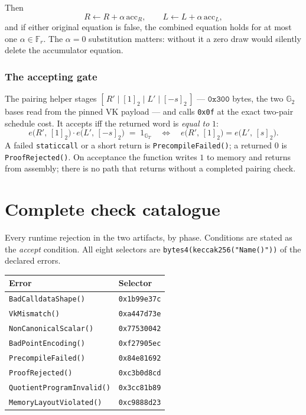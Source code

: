 \documentclass[11pt,a4paper]{article}
\newcommand{\Fr}{\ensuremath{\mathbb{F}_{r}}}
\newcommand{\Gtwo}{\ensuremath{\mathbb{G}_{2}}}
\newcommand{\GT}{\ensuremath{\mathbb{G}_{T}}}
\newcommand{\pair}{\ensuremath{e}}
\newcommand{\code}[1]{\texttt{#1}}
\newcommand{\err}[1]{\textcolor{red!60!black}{\texttt{#1}}}
\theoremstyle{definition}
\begin{document}
Then
\begin{equation}
R \leftarrow R + \alpha\,\mathrm{acc}_R,
\qquad
L \leftarrow L + \alpha\,\mathrm{acc}_L,
\end{equation}
and if either original equation is false, the combined equation holds for at
most one $\alpha \in \Fr$. The $\alpha = 0$ substitution matters: without it a
zero draw would silently delete the accumulator equation.

\subsubsection{The accepting gate}

The pairing helper stages
$[\,R' \mid [1]_2 \mid L' \mid [-s]_2\,]$ --- $\mathtt{0x300}$ bytes, the two
$\Gtwo$ bases read from the pinned VK payload --- and calls \code{0x0f} at the
exact two-pair schedule cost. It accepts iff the returned word is \emph{equal
to} $1$:
\begin{equation}
\pair\big(R',\,[1]_2\big)\cdot \pair\big(L',\,[-s]_2\big) \;=\; 1_{\GT}
\quad\Longleftrightarrow\quad
\pair\big(R',\,[1]_2\big) = \pair\big(L',\,[s]_2\big).
\end{equation}
A failed \code{staticcall} or a short return is \err{PrecompileFailed()}; a
returned $0$ is \err{ProofRejected()}. On acceptance the function writes $1$ to
memory and returns from assembly; there is no path that returns without a
completed pairing check.

\section{Complete check catalogue}
\label{sec:catalogue}

Every runtime rejection in the two artifacts, by phase. Conditions are stated
as the \emph{accept} condition. All eight selectors are
\code{bytes4(keccak256("Name()"))} of the declared errors.

\begin{center}
\begin{tabular}{@{}ll@{}}
\toprule
Error & Selector \\
\midrule
\err{BadCalldataShape()}       & \code{0x1b99e37c} \\
\err{VkMismatch()}             & \code{0xa447d73e} \\
\err{NonCanonicalScalar()}     & \code{0x77530042} \\
\err{BadPointEncoding()}       & \code{0xf27905ec} \\
\err{PrecompileFailed()}       & \code{0x84e81692} \\
\err{ProofRejected()}          & \code{0xc3b0d8cd} \\
\err{QuotientProgramInvalid()} & \code{0x3cc81b89} \\
\err{MemoryLayoutViolated()}   & \code{0xc9888d23} \\
\bottomrule
\end{tabular}
\end{center}
\end{document}
